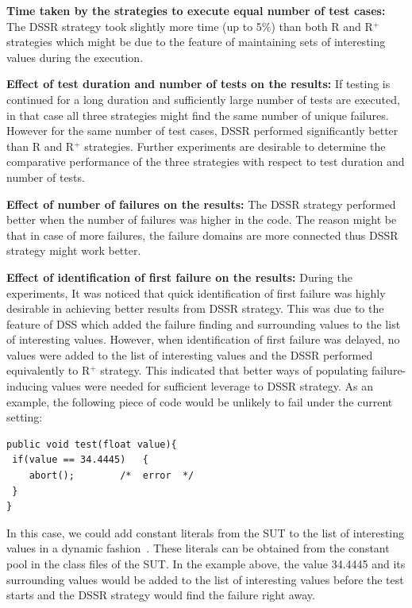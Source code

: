 \textbf{Time taken by the strategies to execute equal number of test cases:}
The DSSR strategy took slightly more time (up to 5\%) than both R and R$^+$ strategies which might be due to the feature of maintaining sets of interesting values during the execution. 

\textbf{Effect of test duration and number of tests on the results:}
If testing is continued for a long duration and sufficiently large number of tests are executed, in that case all three strategies might find the same number of unique failures. However for the same number of test cases, DSSR performed significantly better than R and R$^+$ strategies. Further experiments are desirable to determine the comparative performance of the three strategies with respect to test duration and number of tests.

\textbf{Effect of number of failures on the results:} 
The DSSR strategy performed better when the number of failures was higher in the code. The reason might be that in case of more failures, the failure domains are more connected thus DSSR strategy might work better.

\textbf{Effect of identification of first failure on the results:}
During the experiments, It was noticed that quick identification of first failure was highly desirable in achieving better results from DSSR strategy. This was due to the feature of DSS which added the failure finding and surrounding values to the list of interesting values. However, when identification of first failure was delayed, no values were added to the list of interesting values and the DSSR performed equivalently to R$^+$ strategy. This indicated that better ways of populating failure-inducing values were needed for sufficient leverage to DSSR strategy. As an example, the following piece of code would be unlikely to fail under the current setting:

\bigskip
\bigskip
\begin{lstlisting}
public void test(float value){
 if(value == 34.4445)   {
 	abort(); 		/*  error  */
 }
}
\end{lstlisting}
\bigskip
\bigskip

In this case, we could add constant literals from the SUT to the list of interesting values in a dynamic fashion~\cite{godefroid2005dart}. These literals can be obtained from the constant pool in the class files of the SUT. In the example above, the value 34.4445 and its surrounding values would  be added to the list of interesting values before the test starts and the DSSR strategy would find the failure right away.

